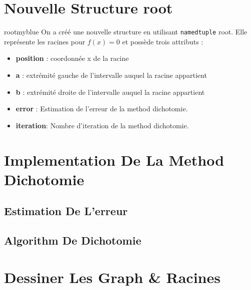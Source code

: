 \section{Nouvelle Structure root}
\begin{prettyBox}{root}{myblue}
On a créé une nouvelle structure en utilisant \texttt{namedtuple} root. Elle représente 
les racines pour \( f(x) = 0 \) et possède trois attributs :
\begin{itemize}
    \item \textbf{position} : coordonnée x de la racine
    \item \textbf{a} : extrémité gauche de l'intervalle auquel la racine appartient
    \item \textbf{b} : extrémité droite de l'intervalle auquel la racine appartient
    \item \textbf{error} : Estimation de l'erreur de la method dichotomie.
    \item \textbf{iteration}: Nombre d'iteration de la method dichotomie.
\end{itemize}
\end{prettyBox}
\vspace{0.5cm}


\vspace{1cm}

\section{Implementation De La Method Dichotomie}
\subsection{Estimation De L'erreur}


\vspace{0.5cm}
\subsection{Algorithm De Dichotomie}


\newpage
\section{Dessiner Les Graph \& Racines}
